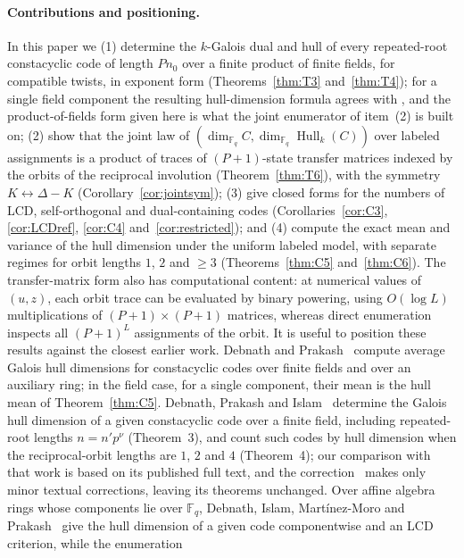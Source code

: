 \documentclass[10pt,journal,draftclsnofoot,onecolumn]{IEEEtran}
\theoremstyle{definition}
\theoremstyle{remark}
\newcommand{\Fq}{\mathbb{F}_q}
\newcommand{\Hull}{\operatorname{Hull}}
\begin{document}
\paragraph{Contributions and positioning.}
In this paper we (1) determine the \(k\)-Galois dual and hull of every
repeated-root constacyclic code of length \(P n_0\) over a finite product
of finite fields, for compatible twists, in exponent form
(Theorems~\ref{thm:T3} and~\ref{thm:T4}); for a single field component
the resulting hull-dimension formula agrees with
\cite[Theorem~3]{DPI2023}, and the product-of-fields form given here is
what the joint enumerator of item~(2) is built on; (2) show that the joint law of
\((\dim_{\Fq} C, \dim_{\Fq} \Hull_k(C))\) over labeled assignments is a
product of traces of \((P{+}1)\)-state transfer matrices indexed by the
orbits of the reciprocal involution (Theorem~\ref{thm:T6}), with the
symmetry \(K \leftrightarrow \Delta - K\)
(Corollary~\ref{cor:jointsym}); (3) give closed forms for the numbers of
LCD, self-orthogonal and dual-containing codes
(Corollaries~\ref{cor:C3}, \ref{cor:LCDref}, \ref{cor:C4}
and~\ref{cor:restricted}); and (4) compute the exact mean and variance
of the hull dimension under the uniform labeled model, with separate
regimes for orbit lengths \(1\), \(2\) and \(\ge 3\)
(Theorems~\ref{thm:C5} and~\ref{thm:C6}). The transfer-matrix form also
has computational content: at numerical values of \((u,z)\), each orbit
trace can be evaluated by binary powering, using \(O(\log L)\)
multiplications of \((P{+}1) \times (P{+}1)\) matrices, whereas direct
enumeration inspects all \((P{+}1)^L\) assignments of the orbit.
It is useful to position these results against the closest earlier
work. Debnath and Prakash~\cite{DP2025} compute average Galois hull
dimensions for constacyclic codes over finite fields and over an
auxiliary ring; in the field case, for a single component, their mean
is the hull mean of Theorem~\ref{thm:C5}. Debnath, Prakash and
Islam~\cite{DPI2023} determine the Galois hull dimension of a given
constacyclic code over a finite field, including repeated-root lengths
\(n = n' p^{\nu}\) (Theorem~3), and count such codes by hull dimension
when the reciprocal-orbit lengths are \(1\), \(2\) and \(4\)
(Theorem~4); our comparison with that work is based on its published
full text, and the correction~\cite{DPI2023corr} makes only minor
textual corrections, leaving its theorems unchanged. Over affine
algebra rings whose components lie over \(\Fq\), Debnath, Islam,
Mart\'inez-Moro and Prakash~\cite{DIMP2026} give the hull dimension of
a given code componentwise and an LCD criterion, while the enumeration
\end{document}
